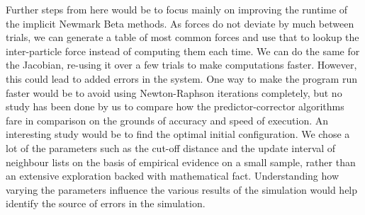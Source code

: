 \documentclass[../Main.tex]{subfiles}
\begin{document}
Further steps from here would be to focus mainly on improving the runtime of the implicit Newmark Beta methods. As forces do not deviate by much between trials, we can generate a table of most common forces and use that to lookup the inter-particle force instead of computing them each time. We can do the same for the Jacobian, re-using it over a few trials to make computations faster. However, this could lead to added errors in the system. One way to make the program run faster would be to avoid using Newton-Raphson iterations completely, but no study has been done by us to compare how the predictor-corrector algorithms fare in comparison on the grounds of accuracy and speed of execution.
An interesting study would be to find the optimal initial configuration. We chose a lot of the parameters such as the cut-off distance and the update interval of neighbour lists on the basis of empirical evidence on a small sample, rather than an extensive exploration backed with mathematical fact. Understanding how varying the parameters influence the various results of the simulation would help identify the source of errors in the simulation.
\end{document}
